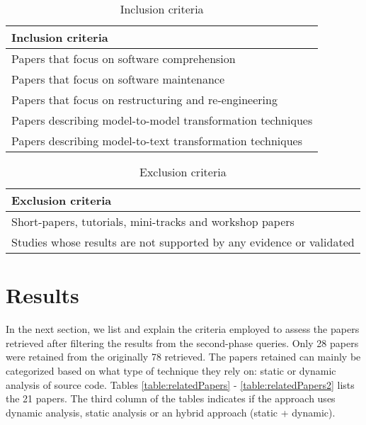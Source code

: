 \begin{table}[ht]
\caption{Inclusion criteria}
\label{table:inclusionCriteria}
\centering
\begin{tabular}{l}
\toprule
\rowcolor[HTML]{BBDAFF}
\textbf{Inclusion criteria}    \\ \hline
  Papers that focus on software comprehension   \\\hline
  Papers that focus on software maintenance \\\hline
  Papers that focus on restructuring and re-engineering  \\\hline
  Papers describing model-to-model transformation techniques  \\\hline
  Papers describing model-to-text transformation techniques  \\\hline
\end{tabular}
\end{table}

\begin{table}[ht]
\caption{Exclusion criteria}
\label{table:exclusionCriteria}
\centering
\begin{tabular}{l}
\toprule
\rowcolor[HTML]{BBDAFF}
\textbf{Exclusion criteria}    \\ \hline
   Short-papers, tutorials, mini-tracks and workshop papers \\ \hline
   Studies whose results are not supported by any evidence or validated \\ \hline
\end{tabular}
\end{table}

\section{Results}

In the next section, we list and explain the criteria employed to assess the papers retrieved after filtering the results from the second-phase queries. Only 28 papers were retained from the originally 78 retrieved. The papers retained can mainly be categorized based on what type of technique they rely on: static or dynamic analysis of source code. Tables \ref{table:relatedPapers} - \ref{table:relatedPapers2} lists the 21 papers. The third column of the tables indicates if the approach uses dynamic analysis, static analysis or an hybrid approach (static + dynamic).

